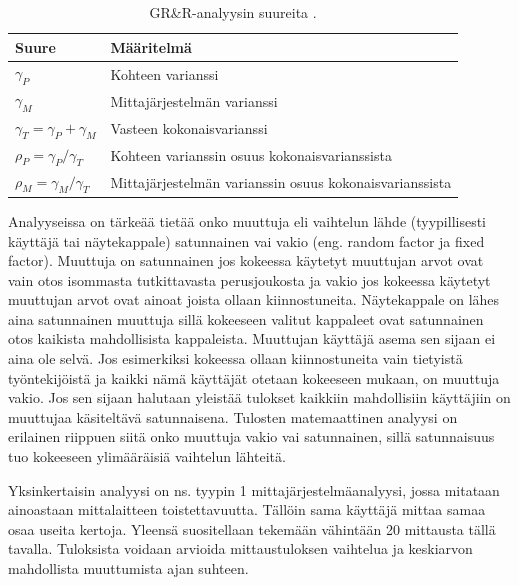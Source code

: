 \documentclass[12pt,a4paper,finnish]{tutthesis}
\begin{document}
\begin{table}[]
\centering
\caption{GR\&R-analyysin suureita \parencite{Burdick2003}.}
\label{table:grr}
\begin{tabular}{@{}ll@{}}
\toprule
Suure                           & Määritelmä                                              \\ \midrule
$\gamma _P$                         & Kohteen varianssi                                       \\
$\gamma _M$                         & Mittajärjestelmän varianssi                             \\
$\gamma _T = \gamma _P + \gamma _M$ & Vasteen kokonaisvarianssi                               \\
$\rho _P = \gamma _P / \gamma _T$   & Kohteen varianssin osuus kokonaisvarianssista           \\
$\rho _M = \gamma _M / \gamma _T$   & Mittajärjestelmän varianssin osuus kokonaisvarianssista
\end{tabular}
\end{table}




Analyyseissa on tärkeää tietää onko muuttuja eli
vaihtelun lähde (tyypillisesti käyttäjä tai näytekappale) satunnainen vai
vakio (eng. random factor ja fixed factor). Muuttuja on satunnainen
jos kokeessa käytetyt muuttujan arvot ovat vain otos isommasta
tutkittavasta perusjoukosta ja vakio jos kokeessa
käytetyt muuttujan arvot ovat ainoat joista ollaan kiinnostuneita.
Näytekappale on lähes aina satunnainen muuttuja sillä kokeeseen
valitut kappaleet ovat satunnainen otos kaikista mahdollisista kappaleista.
Muuttujan käyttäjä asema sen sijaan ei aina ole selvä. Jos esimerkiksi kokeessa
ollaan kiinnostuneita vain tietyistä työntekijöistä ja kaikki
nämä käyttäjät otetaan kokeeseen mukaan, on muuttuja vakio. Jos sen
sijaan halutaan yleistää tulokset kaikkiin mahdollisiin käyttäjiin on muuttujaa
käsiteltävä satunnaisena. Tulosten matemaattinen analyysi on erilainen riippuen
siitä onko muuttuja vakio vai satunnainen, sillä satunnaisuus tuo kokeeseen
ylimääräisiä vaihtelun lähteitä.


Yksinkertaisin analyysi on ns. tyypin 1 mittajärjestelmäanalyysi, jossa
mitataan ainoastaan mittalaitteen toistettavuutta. Tällöin sama käyttäjä
mittaa samaa osaa useita kertoja. Yleensä suositellaan tekemään
vähintään 20 mittausta tällä tavalla. Tuloksista voidaan arvioida mittaustuloksen
vaihtelua ja keskiarvon mahdollista muuttumista ajan suhteen.
\end{document}

